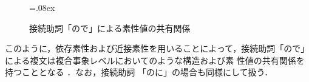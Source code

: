 \begin{figure}[htbp]
\newsavebox{\conjboxc}
\newsavebox{\subboxc}
\newsavebox{\mainboxc}
\newsavebox{\subordboxc}
\newsavebox{\compboxc}
\begin{center}
\unitlength=.08ex
\end{center}
\caption{接続助詞「ので」による素性値の共有関係}
\end{figure}

このように，依存素性および近接素性を用いることによって，接続助詞「ので」
による複文は複合事象レベルにおいてのような構造および素
性値の共有関係を持つこととなる
\cite{Tonoike:HierarchicalClauseStructure,JPSGOverView}．なお，接続助詞
「のに」の場合も同様にして扱う．

